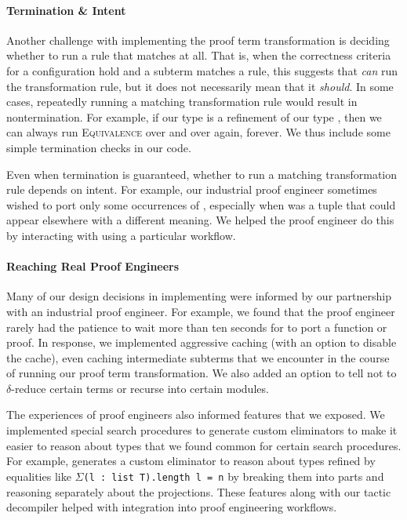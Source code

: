 \paragraph{Termination \& Intent}

Another challenge with implementing the proof term transformation is deciding whether to run a rule that matches at all.
That is, when the correctness criteria for a configuration hold and a subterm matches a rule, this suggests that \toolname \textit{can}
run the transformation rule, but it does not necessarily mean that it \textit{should}.
In some cases, repeatedly running a matching transformation rule would result in nontermination.
For example, if our type \B is a refinement of our type \A, then we can always run \textsc{Equivalence}
over and over again, forever.
We thus include some simple termination checks in our code.

Even when termination is guaranteed, whether to run a matching transformation rule
depends on intent.
For example, our industrial proof engineer sometimes wished to port only some occurrences of \A,
especially when \A was a tuple that could appear elsewhere
with a different meaning.
We helped the proof engineer do this by interacting with \toolname using a particular workflow.

\paragraph{Reaching Real Proof Engineers}
Many of our design decisions in implementing \toolname were informed by our partnership with
an industrial proof engineer.
For example, we found that the proof engineer rarely had the patience to wait more than ten seconds
for \toolname to port a function or proof.
In response, we implemented aggressive caching (with an option to disable the cache), even caching intermediate subterms that
we encounter in the course of running our proof term transformation.
We also added an option to tell \toolname not to $\delta$-reduce certain terms or recurse into certain modules.

The experiences of proof engineers also informed features that we exposed.
We implemented special search procedures to generate custom eliminators to make it easier to reason about
types that we found common for certain search procedures.
For example, \toolname generates a custom eliminator to reason about types refined by equalities like $\Sigma$\lstinline{(l : list T).length l = n}
by breaking them into parts and reasoning separately about the projections.
These features along with our tactic decompiler helped with integration into proof engineering workflows.

